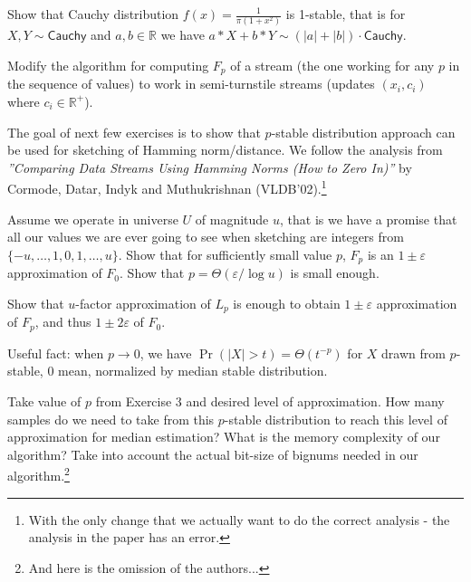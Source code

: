 \documentclass[12pt]{uebung}
\begin{document}
 


\renewcommand{\aufgname}{Exercise}
\begin{aufg}
Show that Cauchy distribution $f(x) = \frac{1}{\pi(1+x^2)}$ is 1-stable, that is for $X,Y \sim \textsf{Cauchy}$ and $a,b \in \mathbb{R}$ we have $a*X+b*Y \sim (|a|+|b|) \cdot \textsf{Cauchy}$.
\end{aufg}

\begin{aufg}
Modify the algorithm for computing $F_p$ of a stream (the one working for any $p$ in the sequence of values) to work in semi-turnstile streams (updates $(x_i,c_i)$ where $c_i \in \mathbb{R}^+$).
\end{aufg}

\bigskip
\bigskip

The goal of next few exercises is to show that $p$-stable distribution approach can be used for sketching of Hamming norm/distance. We follow the analysis from \emph{''Comparing Data Streams Using Hamming Norms
(How to Zero In)''} by Cormode, Datar, Indyk and Muthukrishnan (VLDB'02).\footnote{With the only change that we actually want to do the correct analysis - the analysis in the paper has an error.}

\begin{aufg}
Assume we operate in universe $U$ of magnitude $u$, that is we have a promise that all our values we are ever going to see when sketching are integers from $\{-u,\ldots,1,0,1,\ldots,u\}$. Show that for sufficiently small value $p$, $F_p$ is an $1 \pm \varepsilon$ approximation of $F_0$. Show that $p= \Theta(\varepsilon/\log u)$ is small enough.

Show that $u$-factor approximation of $L_p$ is enough to obtain $1 \pm \varepsilon$ approximation of $F_p$, and thus $1 \pm 2\varepsilon$ of $F_0$.
\end{aufg}

\bigskip
\bigskip


Useful fact: when $p \to 0$, we have $\Pr( |X| > t) = \Theta(t^{-p})$ for $X$ drawn from $p$-stable, 0 mean, normalized by median stable distribution.

\begin{aufg}[2 pts]
Take value of $p$ from Exercise 3 and desired level of approximation. How many samples do we need to take from this $p$-stable distribution to reach this level of approximation for median estimation?
What is the memory complexity of our algorithm? Take into account the actual bit-size of bignums needed in our algorithm.\footnote{And here is the omission of the authors...}
\end{aufg}
\end{document}
